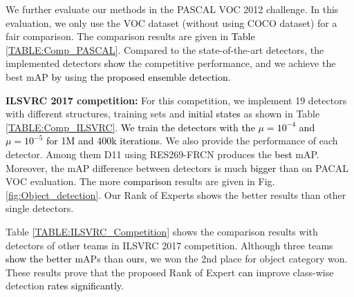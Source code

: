 \documentclass[10pt,twocolumn,letterpaper]{article}
\newcommand{\RV}{\textcolor{black}}
\begin{document}

We further evaluate our methods in the PASCAL VOC 2012 challenge. In this evaluation, we only use the VOC dataset (without using COCO dataset) for a fair comparison. The comparison results are given in \RV{Table} \ref{TABLE:Comp_PASCAL}. Compared to the state-of-the-art detectors, the implemented detectors \RV{show} the competitive performance, and we achieve the best mAP \RV{by} using \RV{the proposed ensemble detection}. 




\textbf{ILSVRC 2017 competition:}
For this competition, we implement 19 detectors with different structures, training sets and \RV{initial states} as shown in Table \ref{TABLE:Comp_ILSVRC}. \RV{We train the detectors with the $\mu = 10^{-4}$ and $\mu = 10^{-5}$ for 1M and 400k iterations}. We also provide the performance of each detector. Among them D11 using RES269-FRCN produces the \RV{best} mAP. Moreover, the mAP difference between detectors is much \RV{bigger} than on PACAL VOC evaluation. The more \RV{comparison} results are given in Fig. \ref{fig:Object_detection}. Our Rank of Experts shows the better results than other single detectors.

%


Table \ref{TABLE:ILSVRC_Competition} shows the comparison results with detectors of other teams in ILSVRC 2017 competition.  Although three teams \RV{show the better} mAPs than \RV{ours}, we won the 2nd place for object category won. These results prove that the proposed Rank of Expert \RV{can} improve class-wise detection \RV{rates significantly}.
 
 
\end{document}
